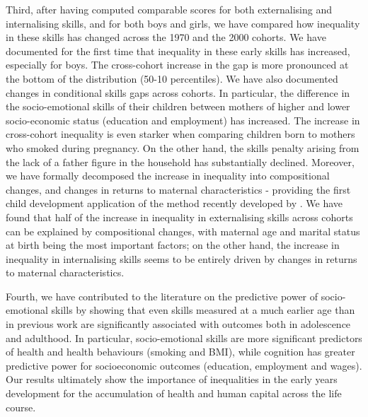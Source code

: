 Third, after having computed comparable scores for both externalising and internalising skills, and for both boys and girls, we have compared how inequality in these skills has changed across the 1970 and the 2000 cohorts. We have documented for the first time that inequality in these early skills has increased, especially for boys. The cross-cohort increase in the gap is more pronounced at the bottom of the distribution (50-10 percentiles). We have also documented changes in conditional skills gaps across cohorts. In particular, the difference in the socio-emotional skills of their children between mothers of higher and lower socio-economic status (education and employment) has increased. The increase in cross-cohort inequality is even starker when comparing children born to mothers who smoked during pregnancy. On the other hand, the skills penalty arising from the lack of a father figure in the household has substantially declined. Moreover, we have formally decomposed the increase in inequality into compositional changes, and changes in returns to maternal characteristics - providing the first child development application of the method recently developed by \citet{firpo2018decomposing}. We have found that half of the increase in inequality in externalising skills across cohorts can be explained by compositional changes, with maternal age and marital status at birth being the most important factors; on the other hand, the increase in inequality in internalising skills seems to be entirely driven by changes in returns to maternal characteristics.

Fourth, we have contributed to the literature on the predictive power of socio-emotional skills by showing that even skills measured at a much earlier age than in previous work are significantly associated with outcomes both in adolescence and adulthood. In particular, socio-emotional skills are more significant predictors of health and health behaviours (smoking and BMI), while cognition has greater predictive power for socioeconomic outcomes (education, employment and wages). Our results ultimately show the importance of inequalities in the early years development for the accumulation of health and human capital across the life course.
